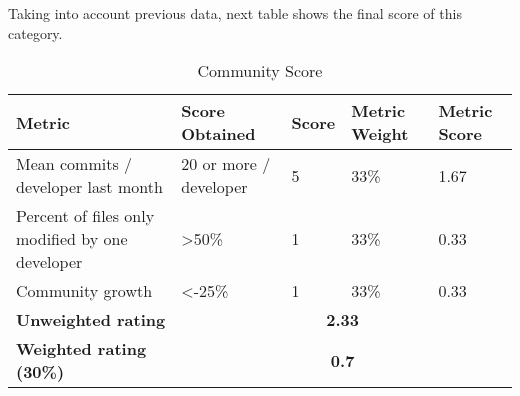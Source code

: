 \documentclass[11pt]{article}
\begin{document}
Taking into account previous data, next table shows the final score of this category.
\begin{table}[H]
  \begin{center}
    \begin{tabular}{ | p{4cm} | p{3cm} | l | p{1.2cm} | p{1.2cm} | }
    \toprule
    \textbf{Metric} & \textbf{Score Obtained} & \textbf{Score} & \textbf{Metric Weight} & \textbf{Metric Score}\\
    \hline
    Mean commits / developer last month & 20 or more / developer & 5 & 33\% & 1.67\\
    \hline
    Percent of files only modified by one developer & \textgreater50\% & 1 & 33\% & 0.33\\
    \hline
    Community growth & \textless-25\% & 1 & 33\% & 0.33\\
    \midrule
    \textbf{Unweighted rating} & \multicolumn{4}{c|}{\textbf{2.33}}\\
    \hline
    \textbf{Weighted rating (30\%)} & \multicolumn {4}{c|}{\textbf{0.7}}\\
    \bottomrule
    \end{tabular}
    \caption{Community Score}
    \label{tab:comm_score}
  \end{center}
\end{table}
\end{document}
